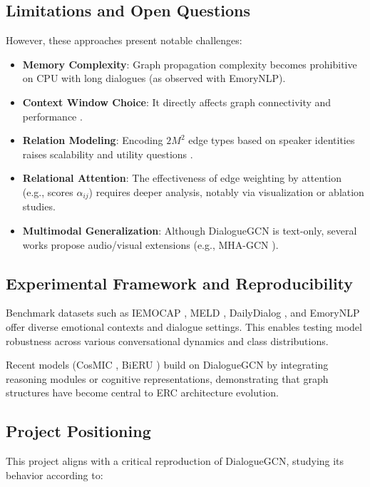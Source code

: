 \documentclass[a4paper,11pt]{article}
\begin{document}
\subsection{Limitations and Open Questions}
However, these approaches present notable challenges:

\begin{itemize}
    \item \textbf{Memory Complexity}: Graph propagation complexity becomes prohibitive on CPU with long dialogues (as observed with EmoryNLP).
    \item \textbf{Context Window Choice}: It directly affects graph connectivity and performance \cite{li2020graph}.
    \item \textbf{Relation Modeling}: Encoding $2M^2$ edge types based on speaker identities raises scalability and utility questions \cite{he2021hierarchical}.
    \item \textbf{Relational Attention}: The effectiveness of edge weighting by attention (e.g., scores $\alpha_{ij}$) requires deeper analysis, notably via visualization or ablation studies.
    \item \textbf{Multimodal Generalization}: Although DialogueGCN is text-only, several works propose audio/visual extensions (e.g., MHA-GCN \cite{zhao2021multi}).
\end{itemize}

\subsection{Experimental Framework and Reproducibility}
Benchmark datasets such as IEMOCAP \cite{busso2008iemocap}, MELD \cite{poria2018meld}, DailyDialog \cite{li2017dailydialog}, and EmoryNLP \cite{zahiri2018emotion} offer diverse emotional contexts and dialogue settings. This enables testing model robustness across various conversational dynamics and class distributions.

Recent models (CosMIC \cite{li2023cosmic}, BiERU \cite{lin2022bieru}) build on DialogueGCN by integrating reasoning modules or cognitive representations, demonstrating that graph structures have become central to ERC architecture evolution.

\subsection{Project Positioning}
This project aligns with a critical reproduction of DialogueGCN, studying its behavior according to:
\end{document}
